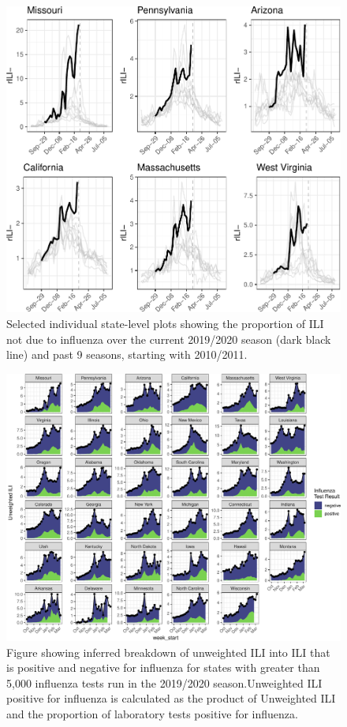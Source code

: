 \documentclass[]{article}
\begin{document}
\begin{figure}
\centering
\includegraphics{ili-labtest-report_files/figure-latex/get-sd-data-1.pdf}
\caption{Selected individual state-level plots showing the proportion of
ILI not due to influenza over the current 2019/2020 season (dark black
line) and past 9 seasons, starting with 2010/2011.}
\end{figure}

\begin{figure}
\centering
\includegraphics{ili-labtest-report_files/figure-latex/state-unweighted-ili-by-pos-neg-1.pdf}
\caption{Figure showing inferred breakdown of unweighted ILI into ILI
that is positive and negative for influenza for states with greater than
5,000 influenza tests run in the 2019/2020 season.Unweighted ILI
positive for influenza is calculated as the product of Unweighted ILI
and the proportion of laboratory tests positive for influenza.}
\end{figure}
\end{document}
